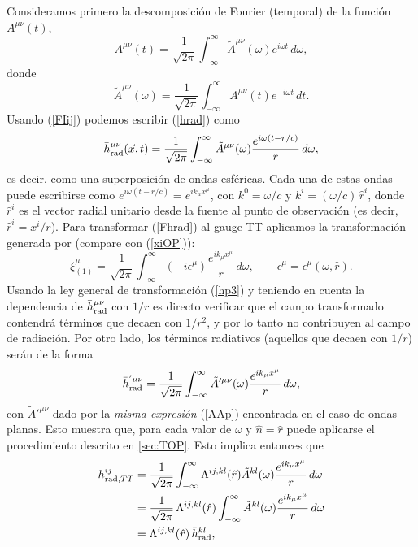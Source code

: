 Consideramos primero la descomposición de Fourier (temporal) de la función $A^{\mu\nu}(t)$,
\begin{equation}\label{FIij}
A^{\mu\nu}(t)=\frac{1}{\sqrt{2\pi}}\int_{-\infty}^\infty \tilde{A}^{\mu\nu}(\omega)e^{i\omega t}\,d\omega,
\end{equation}
donde
\begin{equation}
\tilde{A}^{\mu\nu}(\omega)=\frac{1}{\sqrt{2\pi}}\int_{-\infty}^\infty A^{\mu\nu}(t)e^{-i\omega t}\,dt.
\end{equation}
Usando (\ref{FIij}) podemos escribir (\ref{hrad}) como
\begin{equation}\label{Fhrad}
\bar{h}_{\rm rad}^{\mu\nu}(\vec{x},t)=\frac{1}{\sqrt{2\pi}}\int_{-\infty}^\infty \tilde{A}^{\mu\nu}(\omega)\frac{e^{i\omega (t-r/c)}}{r}\,d\omega,
\end{equation}
es decir, como una superposición de ondas esféricas. Cada una de estas ondas puede escribirse como $e^{i\omega (t-r/c)}=e^{ik_\mu x^\mu}$, con $k^0=\omega/c$ y $k^i=(\omega/c)\,\hat{r}^i$, donde $\hat{r}^i$ es el vector radial unitario desde la fuente al punto de observación (es decir, $\hat{r}^i=x^i/r$). Para transformar (\ref{Fhrad}) al gauge TT aplicamos la transformación generada por (compare con (\ref{xiOP})):
\begin{equation}
\xi^\mu_{(1)}=\frac{1}{\sqrt{2\pi}}\int_{-\infty}^\infty (-i\epsilon^\mu)\frac{e^{ik_\mu x^\mu}}{r}\,d\omega, \qquad \epsilon^\mu=\epsilon^\mu(\omega,\hat{r}).
\end{equation}
Usando la ley general de transformación (\ref{hp3}) y teniendo en cuenta la
dependencia de $\bar{h}_{\rm rad}^{\mu\nu}$ con $1/r$ es directo verificar que
el campo transformado contendrá términos que decaen con $1/r^2$, y por lo tanto no contribuyen al campo de radiación. Por otro lado, los términos radiativos (aquellos que decaen con $1/r$) serán de la forma
\begin{equation}
\bar{h}_{\rm rad}^{'\mu\nu}=\frac{1}{\sqrt{2\pi}}\int_{-\infty}^\infty \tilde{A}'^{\mu\nu}(\omega)\frac{e^{ik_\mu x^\mu}}{r}\,d\omega,
\end{equation}
con $\tilde{A}'^{\mu\nu}$ dado por la \textit{misma expresión} (\ref{AAp}) encontrada en el caso de ondas planas. Esto muestra que, para cada valor de $\omega$ y $\hat{n}=\hat{r}$ puede aplicarse el procedimiento descrito en \ref{sec:TOP}. Esto implica entonces que
\begin{align}
h_{{\rm rad}, TT}^{ij} &= \frac{1}{\sqrt{2\pi}}\int_{-\infty}^\infty \Lambda^{ij,kl}(\hat{r})\tilde{A}^{kl}(\omega)\frac{e^{ik_\mu x^\mu}}{r}\,d\omega \\
&= \frac{1}{\sqrt{2\pi}}\,\Lambda^{ij,kl}(\hat{r})\int_{-\infty}^\infty \tilde{A}^{kl}(\omega)\frac{e^{ik_\mu x^\mu}}{r}\,d\omega \\
&= \Lambda^{ij,kl}(\hat{r})\,\bar{h}_{\rm rad}^{kl},
\end{align}
